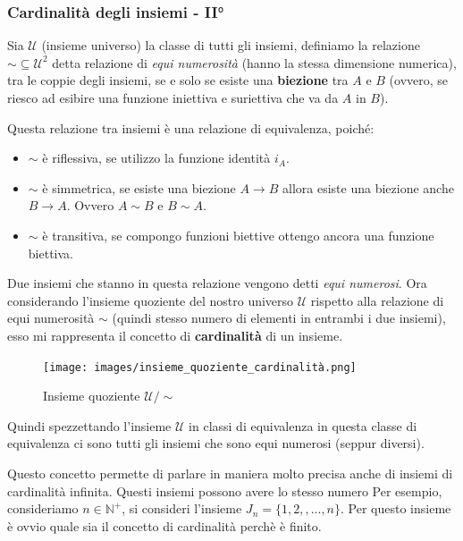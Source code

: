 \documentclass{article}
\begin{document}
\subsubsection{Cardinalità degli insiemi - II°}
Sia $\mathcal{U}$ (insieme universo) la classe di tutti gli insiemi,
definiamo la relazione $\sim\subseteq\mathcal{U}^2$ detta relazione
di \textit{equi numerosità} (hanno la stessa dimensione numerica), tra le coppie degli insiemi, se e solo se esiste
una \textbf{biezione} tra $A$ e $B$ (ovvero, se riesco ad esibire una funzione
iniettiva e suriettiva che va da $A$ in $B$).

Questa relazione tra insiemi è una relazione di equivalenza, poiché:
\begin{itemize}
    \item $\sim$ è riflessiva, se utilizzo la funzione identità $i_A$.
    \item $\sim$ è simmetrica, se esiste una biezione $A\rightarrow B$ allora
          esiste una biezione anche $B\rightarrow A$. Ovvero $A\sim B$ e $B\sim A$.
    \item $\sim$ è transitiva, se compongo funzioni biettive ottengo ancora una
          funzione biettiva.
\end{itemize}

Due insiemi che stanno in questa relazione vengono detti \textit{equi numerosi}. Ora
considerando l'insieme quoziente del nostro universo $\mathcal{U}$ rispetto alla
relazione di equi numerosità $\sim$ (quindi stesso numero di elementi in entrambi
i due insiemi), esso mi rappresenta il concetto di \textbf{cardinalità}
di un insieme.

\begin{figure}[H]
    \centering
    \texttt{[image: images/insieme\_quoziente\_cardinalità.png]}
    \caption{Insieme quoziente $\mathcal{U} / \sim$}
\end{figure}

Quindi spezzettando l'insieme $\mathcal{U}$ in classi di equivalenza
in questa classe di equivalenza ci sono tutti gli insiemi
che sono equi numerosi (seppur diversi).

Questo concetto permette di parlare in maniera molto precisa anche di
insiemi di cardinalità infinita.
Questi insiemi possono avere lo stesso numero
\newline
\newline
Per esempio, consideriamo $n\in\mathbb{N}^+$, si consideri l'insieme $J_n=\{1,2,,...,n\}$. Per questo
insieme è ovvio quale sia il concetto di cardinalità perchè è finito.
\end{document}
